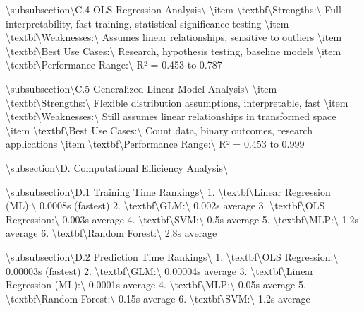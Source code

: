 \documentclass[11pt,a4paper]{article}
\begin{document}
\textbackslash{}subsubsection\textbackslash{}{C.4 OLS Regression Analysis\textbackslash{}}
\textbackslash{}item \textbackslash{}textbf\textbackslash{}{Strengths:\textbackslash{}} Full interpretability, fast training, statistical significance testing
\textbackslash{}item \textbackslash{}textbf\textbackslash{}{Weaknesses:\textbackslash{}} Assumes linear relationships, sensitive to outliers
\textbackslash{}item \textbackslash{}textbf\textbackslash{}{Best Use Cases:\textbackslash{}} Research, hypothesis testing, baseline models
\textbackslash{}item \textbackslash{}textbf\textbackslash{}{Performance Range:\textbackslash{}} R² = 0.453 to 0.787

\textbackslash{}subsubsection\textbackslash{}{C.5 Generalized Linear Model Analysis\textbackslash{}}
\textbackslash{}item \textbackslash{}textbf\textbackslash{}{Strengths:\textbackslash{}} Flexible distribution assumptions, interpretable, fast
\textbackslash{}item \textbackslash{}textbf\textbackslash{}{Weaknesses:\textbackslash{}} Still assumes linear relationships in transformed space
\textbackslash{}item \textbackslash{}textbf\textbackslash{}{Best Use Cases:\textbackslash{}} Count data, binary outcomes, research applications
\textbackslash{}item \textbackslash{}textbf\textbackslash{}{Performance Range:\textbackslash{}} R² = 0.453 to 0.999

\textbackslash{}subsection\textbackslash{}{D. Computational Efficiency Analysis\textbackslash{}}

\textbackslash{}subsubsection\textbackslash{}{D.1 Training Time Rankings\textbackslash{}}
1. \textbackslash{}textbf\textbackslash{}{Linear Regression (ML):\textbackslash{}} 0.0008s (fastest)
2. \textbackslash{}textbf\textbackslash{}{GLM:\textbackslash{}} 0.002s average
3. \textbackslash{}textbf\textbackslash{}{OLS Regression:\textbackslash{}} 0.003s average
4. \textbackslash{}textbf\textbackslash{}{SVM:\textbackslash{}} 0.5s average
5. \textbackslash{}textbf\textbackslash{}{MLP:\textbackslash{}} 1.2s average
6. \textbackslash{}textbf\textbackslash{}{Random Forest:\textbackslash{}} 2.8s average

\textbackslash{}subsubsection\textbackslash{}{D.2 Prediction Time Rankings\textbackslash{}}
1. \textbackslash{}textbf\textbackslash{}{OLS Regression:\textbackslash{}} 0.00003s (fastest)
2. \textbackslash{}textbf\textbackslash{}{GLM:\textbackslash{}} 0.00004s average
3. \textbackslash{}textbf\textbackslash{}{Linear Regression (ML):\textbackslash{}} 0.0001s average
4. \textbackslash{}textbf\textbackslash{}{MLP:\textbackslash{}} 0.05s average
5. \textbackslash{}textbf\textbackslash{}{Random Forest:\textbackslash{}} 0.15s average
6. \textbackslash{}textbf\textbackslash{}{SVM:\textbackslash{}} 1.2s average
\end{document}
